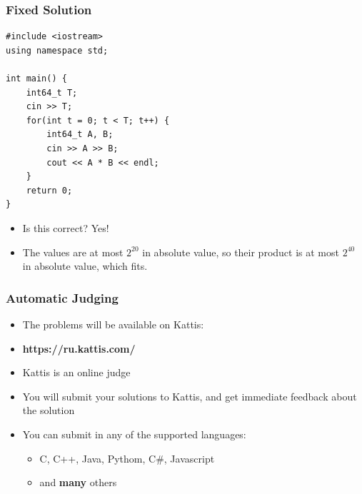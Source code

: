 \documentclass{beamer}
\begin{document}
\begin{frame}
    \frametitle{Fixed Solution}
	\begin{scriptsize}
        \begin{verbatim}
#include <iostream>
using namespace std;

int main() {
    int64_t T;
    cin >> T;
    for(int t = 0; t < T; t++) {
        int64_t A, B;
        cin >> A >> B;
        cout << A * B << endl;
    }
    return 0;
}
        \end{verbatim}
    \end{scriptsize}
    \begin{itemize}
       \item<2-> Is this correct?  {\alert{Yes!}}
       \item<3-> The values are at most $2^{20}$ in absolute value, so their product is at most $2^{40}$ in absolute value, which fits. 
    \end{itemize}
\end{frame}

\begin{frame}[plain]
    \frametitle{Automatic Judging}
    \begin{itemize}
        \item The problems will be available on \alert{Kattis}:
        \item \textbf{https://ru.kattis.com/}
        \vspace{20pt}
        \item Kattis is an online judge
        \item You will submit your solutions to Kattis, and get immediate feedback about the solution
        \item You can submit in any of the supported languages:
        \begin{itemize}
            \item C, C++, Java, Pythom, C\#{}, Javascript
            \item and \textbf{many} others
        \end{itemize}
    \end{itemize}
\end{frame}
\end{document}
